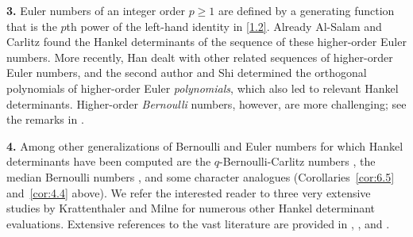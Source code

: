 \documentclass{amsart}
\theoremstyle{plain}
\numberwithin{equation}{section}
\begin{document}
{\bf 3.} Euler numbers of an integer order $p\geq 1$ are defined by a
generating function that is the $p$th power of the left-hand identity in
\eqref{1.2}. Already Al-Salam and Carlitz \cite{AC} found the Hankel 
determinants of the sequence of these higher-order Euler numbers. More 
recently, Han \cite{Ha} dealt with other related sequences of higher-order
Euler numbers, and the second author and Shi \cite{JS} determined the 
orthogonal polynomials of higher-order Euler {\it polynomials\/}, which also
led to relevant Hankel determinants. Higher-order {\it Bernoulli} numbers,
however, are more challenging; see the remarks in \cite[p.~401]{JS}.

{\bf 4.} Among other generalizations of Bernoulli and Euler numbers for which
Hankel determinants have been computed are the $q$-Bernoulli-Carlitz numbers
\cite{CZ}, the median Bernoulli numbers \cite{Ch}, and some character
analogues (Corollaries~\ref{cor:6.5} and~\ref{cor:4.4} above). We refer the
interested reader to three very extensive studies by Krattenthaler
\cite{Kr, Kr2} and Milne \cite{Mi} for numerous other Hankel determinant
evaluations. Extensive references to the vast literature are provided in
\cite[pp.~47--48]{Kr}, \cite[p.~122]{Kr2}, and \cite[pp.~54--57]{Mi}.
\end{document}
